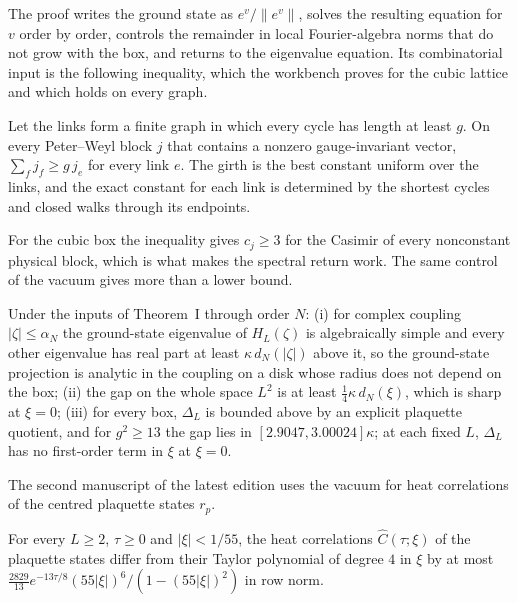 The proof writes the ground state as $e^v/\|e^v\|$, solves the resulting equation for $v$ order by order, controls the remainder in local Fourier-algebra norms that do not grow with the box, and returns to the eigenvalue equation. Its combinatorial input is the following inequality, which the workbench proves for the cubic lattice and which holds on every graph.

\begin{introthm}
Let the links form a finite graph in which every cycle has length at least $g$. On every Peter--Weyl block $j$ that contains a nonzero gauge-invariant vector, $\sum_fj_f\ge g\,j_e$ for every link $e$. The girth is the best constant uniform over the links, and the exact constant for each link is determined by the shortest cycles and closed walks through its endpoints.
\end{introthm}

For the cubic box the inequality gives $c_j\ge3$ for the Casimir of every nonconstant physical block, which is what makes the spectral return work. The same control of the vacuum gives more than a lower bound.

\begin{introthm}
Under the inputs of Theorem~I through order $N$:
(i) for complex coupling $|\zeta|\le\alpha_N$ the ground-state eigenvalue of $H_L(\zeta)$ is algebraically simple and every other eigenvalue has real part at least $\kappa\,d_N(|\zeta|)$ above it, so the ground-state projection is analytic in the coupling on a disk whose radius does not depend on the box;
(ii) the gap on the whole space $L^2$ is at least $\frac14\kappa\,d_N(\xi)$, which is sharp at $\xi=0$;
(iii) for every box, $\Delta_L$ is bounded above by an explicit plaquette quotient, and for $g^2\ge13$ the gap lies in $[2.9047,3.00024]\kappa$; at each fixed $L$, $\Delta_L$ has no first-order term in $\xi$ at $\xi=0$.
\end{introthm}

The second manuscript of the latest edition uses the vacuum for heat correlations of the centred plaquette states $r_p$.

\begin{introthm}
For every $L\ge2$, $\tau\ge0$ and $|\xi|<1/55$, the heat correlations $\widehat C(\tau;\xi)$ of the plaquette states differ from their Taylor polynomial of degree $4$ in $\xi$ by at most $\frac{2829}{13}e^{-13\tau/8}(55|\xi|)^6/(1-(55|\xi|)^2)$ in row norm.
\end{introthm}

